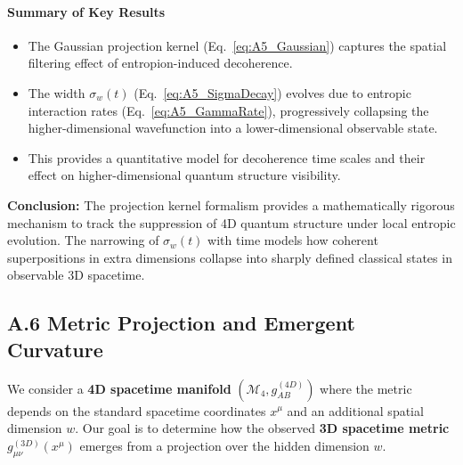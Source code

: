\documentclass[12pt]{article}
\begin{document}
\paragraph{Summary of Key Results}

\begin{itemize}
  \item The Gaussian projection kernel (Eq.~\eqref{eq:A5_Gaussian}) captures the spatial filtering effect of entropion-induced decoherence.
  \item The width \(\sigma_w(t)\) (Eq.~\eqref{eq:A5_SigmaDecay}) evolves due to entropic interaction rates (Eq.~\eqref{eq:A5_GammaRate}), progressively collapsing the higher-dimensional wavefunction into a lower-dimensional observable state.
  \item This provides a quantitative model for decoherence time scales and their effect on higher-dimensional quantum structure visibility.
\end{itemize}

\textbf{Conclusion:}  
The projection kernel formalism provides a mathematically rigorous mechanism to track the suppression of 4D quantum structure under local entropic evolution. The narrowing of \(\sigma_w(t)\) with time models how coherent superpositions in extra dimensions collapse into sharply defined classical states in observable 3D spacetime.




\subsection*{A.6 \quad Metric Projection and Emergent Curvature}
\label{eq:A6}

We consider a \textbf{4D spacetime manifold} \((\mathcal{M}_4, g^{(4D)}_{AB})\) where the metric depends on the standard spacetime coordinates \(x^\mu\) and an additional spatial dimension \(w\). Our goal is to determine how the observed \textbf{3D spacetime metric} \(g^{(3D)}_{\mu\nu}(x^\mu)\) emerges from a projection over the hidden dimension \(w\).
\end{document}
